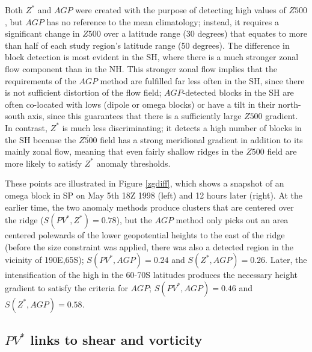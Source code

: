 \documentclass[smallextended]{svjour3}       %
\numberwithin{equation}{section}
\begin{document}
Both $Z^*$ and $AGP$ were created with the purpose of detecting high values of $Z500$, but $AGP$ has no reference to the mean climatology; instead, it requires a significant change in $Z500$ over a latitude range (30 degrees) that equates to more than half of each study region's latitude range (50 degrees). The difference in block detection is most evident in the SH, where there is a much stronger zonal flow component than in the NH. This stronger zonal flow implies that the requirements of the $AGP$ method are fulfilled far less often in the SH, since there is not sufficient distortion of the flow field; $AGP$-detected blocks in the SH are often co-located with lows (dipole or omega blocks) or have a tilt in their north-south axis, since this guarantees that there is a sufficiently large $Z500$ gradient. In contrast, $Z^*$ is much less discriminating; it detects a high number of blocks in the SH because the $\overline{Z500}$ field has a strong meridional gradient in addition to its mainly zonal flow, meaning that even fairly shallow ridges in the $Z500$ field are more likely to satisfy $Z^*$ anomaly thresholds. 

These points are illustrated in Figure \ref{zgdiff}, which shows a snapshot of an omega block in SP on May 5th 18Z 1998 (left) and 12 hours later (right). At the earlier time, the two anomaly methods produce clusters that are centered over the ridge ($S(PV^*, Z^*)=0.78$), but the $AGP$ method only picks out an area centered polewards of the lower geopotential heights to the east of the ridge (before the size constraint was applied, there was also a detected region in the vicinity of 190E,65S); $S(PV^*, AGP)=0.24$ and $S(Z^*, AGP)=0.26$. Later, the intensification of the high in the 60-70S latitudes produces the necessary height gradient to satisfy the criteria for $AGP$; $S(PV^*, AGP)=0.46$ and $S(Z^*, AGP)=0.58$. 

\subsection{$PV^*$ links to shear and vorticity}\label{shearvort}
\end{document}
